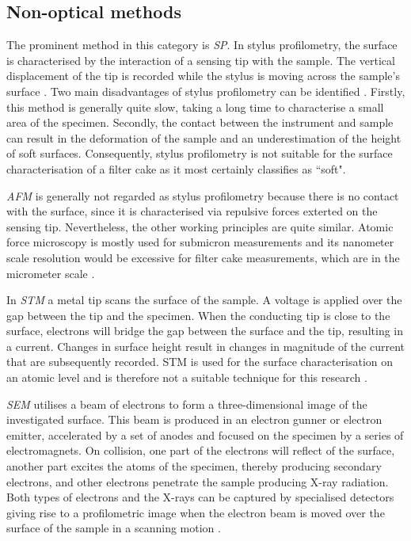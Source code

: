 \subsection{Non-optical methods}
The prominent method in this category is \emph{\gls{SP}}. In stylus profilometry, the surface is characterised by the interaction of a sensing tip with the sample. The vertical displacement of the tip is recorded while the stylus is moving across the sample's surface \citep{Lonardo2002}. %
Two main disadvantages of stylus profilometry can be identified \citep{stout2000,Lonardo2002}. Firstly, this method is generally quite slow, taking a long time to characterise a small area of the specimen. Secondly, the contact between the instrument and sample can result in the deformation of the sample and an underestimation of the height of soft surfaces.  Consequently, stylus profilometry is not suitable for the surface characterisation of a filter cake as it most certainly classifies as ``soft". \par
\emph{\Gls{AFM}} is generally not regarded as stylus profilometry because there is no contact with the surface, since it is characterised via repulsive forces exterted on the sensing tip. Nevertheless, the other working principles are quite similar. Atomic force microscopy is mostly used for submicron measurements and its nanometer scale resolution would be excessive for filter cake measurements, which are in the micrometer scale \citep{Search1997}. \par
In \emph{\gls{STM}} a metal tip scans the surface of the sample. A voltage is applied over the gap between the tip and the specimen. When the conducting tip is close to the surface,  electrons will bridge the gap between the surface and the tip, resulting in a current. Changes in surface height result in changes in magnitude of the current that are subsequently recorded. STM is used for the surface characterisation on an atomic level and is therefore not a suitable technique for this research \citep{Binnig1982,Hansma1987}.\par
\emph{\Gls{SEM}} utilises a beam of electrons to form a three-dimensional image of the investigated surface. This beam is produced in an electron gunner or electron emitter, accelerated by a set of anodes and focused on the specimen by a series of electromagnets. On collision, one part of the electrons will reflect of the surface, another part excites the atoms of the specimen, thereby producing secondary electrons, and other electrons penetrate the sample producing X-ray radiation. Both types of electrons and the X-rays can be captured by specialised detectors giving rise to a profilometric image when the electron beam is moved over the surface of the sample in a scanning motion \citep{Reimer2013,sem2}.
